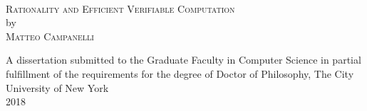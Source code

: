 \begin{titlepage}

\begin{center}

~\vspace{2in}

\textsc{Rationality and Efficient Verifiable Computation} \\[0.5in]
by \\[0.5in]
\textsc{Matteo Campanelli} 

\vspace{\fill}
A dissertation submitted to the Graduate Faculty in Computer Science in partial fulfillment of the requirements for the degree of Doctor of Philosophy, The City University of New York \\[0.25in]
2018

\end{center}

\end{titlepage}
